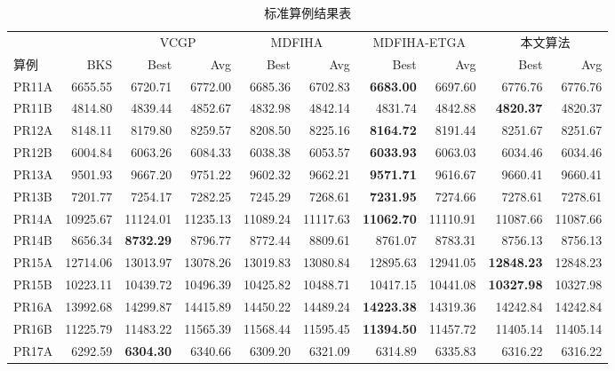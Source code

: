 \documentclass{setp-new}
\newcommand{\setptabsetup}{\small\renewcommand{\arraystretch}{0.95}\setlength{\tabcolsep}{2.2pt}\hbadness=10000}
\begin{document}
\begin{table}[H]
  \centering
  \caption{标准算例结果表}
  \label{tab:benchmark-results}
  \setptabsetup
  \begin{tabular*}{\textwidth}{@{\extracolsep{\fill}}lrrrrrrrrr@{}}
    \toprule
    & & \multicolumn{2}{c}{VCGP\cite{ref:74}} & \multicolumn{2}{c}{MDFIHA\cite{ref:75}} & \multicolumn{2}{c}{MDFIHA-ETGA\cite{ref:75}} & \multicolumn{2}{c}{本文算法}\\
    \cmidrule(lr){3-4}\cmidrule(lr){5-6}\cmidrule(lr){7-8}\cmidrule(lr){9-10}
    算例 & BKS & Best & Avg & Best & Avg & Best & Avg & Best & Avg\\
    \midrule
    PR11A & 6655.55 & 6720.71 & 6772.00 & 6685.36 & 6702.83 & \textbf{6683.00} & 6697.60 & 6776.76 & 6776.76\\
    PR11B & 4814.80 & 4839.44 & 4852.67 & 4832.98 & 4842.14 & 4831.74 & 4842.88 & \textbf{4820.37} & 4820.37\\
    PR12A & 8148.11 & 8179.80 & 8259.57 & 8208.50 & 8225.16 & \textbf{8164.72} & 8191.44 & 8251.67 & 8251.67\\
    PR12B & 6004.84 & 6063.26 & 6084.33 & 6038.38 & 6053.57 & \textbf{6033.93} & 6063.03 & 6034.46 & 6034.46\\
    PR13A & 9501.93 & 9667.20 & 9751.22 & 9602.32 & 9662.21 & \textbf{9571.71} & 9616.67 & 9660.41 & 9660.41\\
    PR13B & 7201.77 & 7254.17 & 7282.25 & 7245.29 & 7268.61 & \textbf{7231.95} & 7274.66 & 7278.61 & 7278.61\\
    PR14A & 10925.67 & 11124.01 & 11235.13 & 11089.24 & 11117.63 & \textbf{11062.70} & 11110.91 & 11087.66 & 11087.66\\
    PR14B & 8656.34 & \textbf{8732.29} & 8796.77 & 8772.44 & 8809.61 & 8761.07 & 8783.31 & 8756.13 & 8756.13\\
    PR15A & 12714.06 & 13013.97 & 13078.26 & 13019.83 & 13080.84 & 12895.63 & 12941.05 & \textbf{12848.23} & 12848.23\\
    PR15B & 10223.11 & 10439.72 & 10496.39 & 10425.82 & 10488.71 & 10417.15 & 10441.08 & \textbf{10327.98} & 10327.98\\
    PR16A & 13992.68 & 14299.87 & 14415.89 & 14450.22 & 14489.24 & \textbf{14223.38} & 14319.36 & 14242.84 & 14242.84\\
    PR16B & 11225.79 & 11483.22 & 11565.39 & 11568.44 & 11595.45 & \textbf{11394.50} & 11457.72 & 11405.14 & 11405.14\\
    PR17A & 6292.59 & \textbf{6304.30} & 6340.66 & 6309.20 & 6321.09 & 6314.89 & 6335.83 & 6316.22 & 6316.22\\

\end{tabular*}
\end{table}
\end{document}
